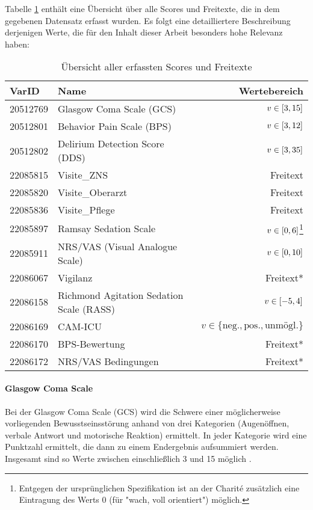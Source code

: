 Tabelle \ref{table:varids} enthält eine Übersicht über alle Scores und Freitexte, die in dem gegebenen Datensatz erfasst wurden. Es folgt eine detailliertere Beschreibung derjenigen Werte, die für den Inhalt dieser Arbeit besonders hohe Relevanz haben:

\begin{table}[htb] %
    \centering
    \begin{tabular}{llr}\toprule
        \textbf{VarID}	&\textbf{Name} &\textbf{Wertebereich} \\\midrule
        20512769    & Glasgow Coma Scale (GCS)          & $v \in \interval{3}{15}$ \\
        20512801    & Behavior Pain Scale (BPS)         & $v \in \interval{3}{12}$ \\
        20512802    & Delirium Detection Score (DDS)    & $v \in \interval{3}{35}$ \\
        22085815    & Visite\_ZNS                        & Freitext \\
        22085820    & Visite\_Oberarzt                   & Freitext \\
        22085836    & Visite\_Pflege                     & Freitext \\
        22085897    & Ramsay Sedation Scale             & $v \in \interval{0}{6}$\footnote{Entgegen der ursprünglichen Spezifikation ist an der Charité zusätzlich eine Eintragung des Werts $0$ (für "wach, voll orientiert") möglich.} \\
        22085911    & NRS/VAS (Visual Analogue Scale)   & $v \in \interval{0}{10}$ \\
        22086067    & Vigilanz                          & Freitext* \\
        22086158    & Richmond Agitation Sedation Scale (RASS) & $v \in \interval{-5}{4}$ \\
        22086169    & CAM-ICU                           & $v \in \{	\text{neg.}, \text{pos.}, \text{unmögl.} \}$ \\
        22086170    & BPS-Bewertung                     & Freitext* \\
        22086172    & NRS/VAS Bedingungen               & Freitext* \\\bottomrule
    \end{tabular}

    \caption{Übersicht aller erfassten Scores und Freitexte}
    \label{table:varids}
\end{table}

\paragraph{Glasgow Coma Scale}
Bei der Glasgow Coma Scale (GCS) wird die Schwere einer möglicherweise vorliegenden Bewusstseinsstörung anhand von drei Kategorien (Augenöffnen, verbale Antwort und motorische Reaktion) ermittelt. In jeder Kategorie wird eine Punktzahl ermittelt, die dann zu einem Endergebnis aufsummiert werden. Insgesamt sind so Werte zwischen einschließlich 3 und 15 möglich \citep{teasdaleAssessmentComaImpaired1974,marxIntensivmedizin2015c}.

